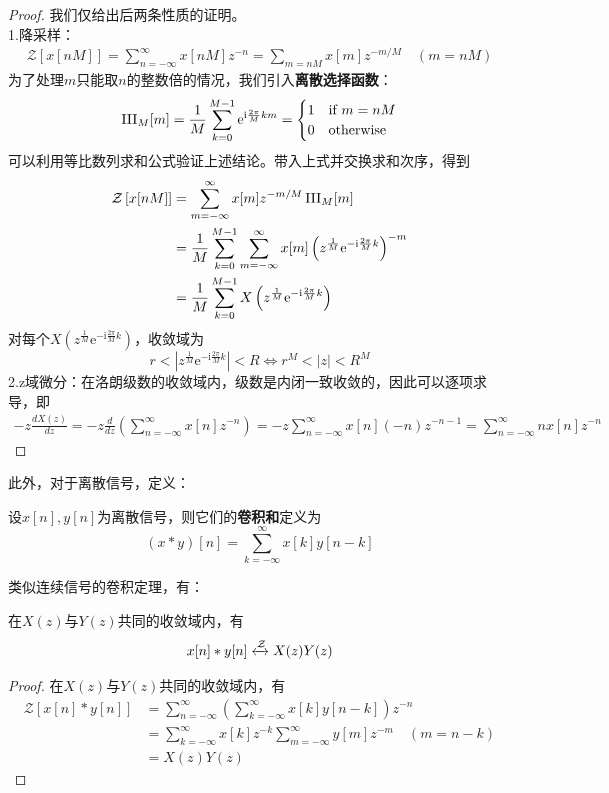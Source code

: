 \begin{proof}
    我们仅给出后两条性质的证明。\\
    1.降采样：
    \begin{align*}
        \mathcal{Z}\left[x[nM]\right]=\sum_{n=-\infty}^{\infty}x[nM]z^{-n}=\sum_{m=nM}x[m]z^{-m/M}\quad(m=nM)
    \end{align*}
    为了处理$m$只能取$n$的整数倍的情况，我们引入\textbf{离散选择函数}：
    \[\operatorname{III}_M[m]=\frac{1}{M}\sum_{k=0}^{M-1}\mathrm{e}^{\mathrm{i}\frac{2\pi}{M}km}=\begin{cases}
        1 & \text{if }m=nM\\
        0 & \text{otherwise}
    \end{cases}\]
    可以利用等比数列求和公式验证上述结论。带入上式并交换求和次序，得到
    \begin{align*}
        \mathcal{Z}\left[x[nM]\right]&=\sum_{m=-\infty}^{\infty}x[m]z^{-m/M}\operatorname{III}_M[m]\\
        &=\frac{1}{M}\sum_{k=0}^{M-1}\sum_{m=-\infty}^{\infty}x[m]\left(z^{\frac{1}{M}}\mathrm{e}^{-\mathrm{i}\frac{2\pi}{M}k}\right)^{-m}\\
        &=\frac{1}{M}\sum_{k=0}^{M-1}X\left(z^{\frac{1}{M}}\mathrm{e}^{-\mathrm{i}\frac{2\pi}{M}k}\right)
    \end{align*}
    对每个$X\left(z^{\frac{1}{M}}\mathrm{e}^{-\mathrm{i}\frac{2\pi}{M}k}\right)$，收敛域为
    \[r<\left|z^{\frac{1}{M}}\mathrm{e}^{-\mathrm{i}\frac{2\pi}{M}k}\right|< R\iff r^{M}<|z|<R^{M}\]
    2.z域微分：在洛朗级数的收敛域内，级数是内闭一致收敛的，因此可以逐项求导，即
    \begin{align*}
        -z\frac{dX(z)}{dz}=-z\frac{d}{dz}\left(\sum_{n=-\infty}^{\infty}x[n]z^{-n}\right)=-z\sum_{n=-\infty}^{\infty}x[n](-n)z^{-n-1}=\sum_{n=-\infty}^{\infty}n x[n]z^{-n}
    \end{align*}
\end{proof}

此外，对于离散信号，定义：
\begin{definition}[卷积和]
    设$x[n],y[n]$为离散信号，则它们的\textbf{卷积和}定义为
    \[(x*y)[n]=\sum_{k=-\infty}^{\infty}x[k]y[n-k]\]
\end{definition}
类似连续信号的卷积定理，有：
\begin{proposition}[卷积和定理]
    在$X(z)$与$Y(z)$共同的收敛域内，有
    \[x[n]*y[n]\xleftrightarrow{\mathcal{Z}} X(z)Y(z)\]
\end{proposition}

\begin{proof}
    在$X(z)$与$Y(z)$共同的收敛域内，有
    \begin{align*}
        \mathcal{Z} \left[x[n]*y[n]\right]&=\sum_{n=-\infty}^{\infty}\left(\sum_{k=-\infty}^{\infty}x[k]y[n-k]\right)z^{-n}\\
        &=\sum_{k=-\infty}^{\infty}x[k]z^{-k}\sum_{m=-\infty}^{\infty}y[m]z^{-m}\quad(m=n-k)\\
        &=X(z)Y(z)
    \end{align*}
\end{proof}

